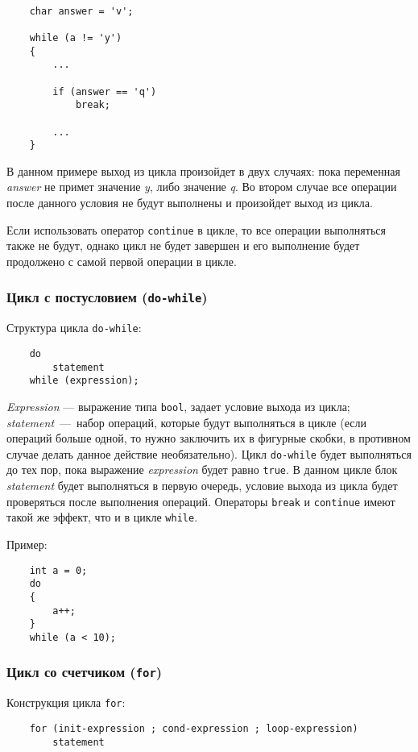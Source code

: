 \begin{lstlisting}

    char answer = 'v';

    while (a != 'y')
    {
        ...

        if (answer == 'q')
            break;

        ...
    }

\end{lstlisting}

В данном примере выход из цикла произойдет в двух случаях: пока переменная \textit{answer} не примет значение \textit{y}, либо значение \textit{q}. Во втором случае все операции после данного условия не будут выполнены и произойдет выход из цикла.

Если использовать оператор \lstinline|continue| в цикле, то все операции выполняться также не будут, однако цикл не будет завершен и его выполнение будет продолжено с самой первой операции в цикле.

\subsubsection{Цикл с постусловием (\texttt{do-while})}
Структура цикла \lstinline|do-while|:
\begin{lstlisting}
    do
        statement
    while (expression);
\end{lstlisting}

\textit{Expression} --- выражение типа \lstinline|bool|, задает условие выхода из цикла; \textit{statement}~---~набор операций, которые будут выполняться в цикле (если операций больше одной, то нужно заключить их в фигурные скобки, в противном случае делать данное действие необязательно). Цикл \lstinline|do-while| будет выполняться до тех пор, пока выражение \textit{expression} будет равно \lstinline|true|. В данном цикле блок \textit{statement} будет выполняться в первую очередь, условие выхода из цикла будет проверяться после выполнения операций. Операторы \lstinline|break| и \lstinline|continue| имеют такой же эффект, что и в цикле \lstinline|while|.

Пример:
\begin{lstlisting}
    int a = 0;
    do
    {
        a++;
    }
    while (a < 10);
\end{lstlisting}

\subsubsection{Цикл со счетчиком (\texttt{for})}
Конструкция цикла \lstinline|for|:
\begin{lstlisting}
    for (init-expression ; cond-expression ; loop-expression)
        statement
\end{lstlisting}

